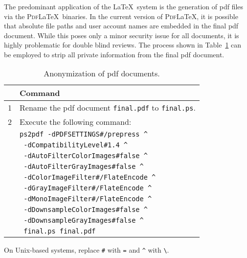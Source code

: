 The predominant application of the \LaTeX\ system is the generation of \gls{pdf} files via the \textsc{Pdf}\LaTeX\ binaries.
In the current version of \textsc{Pdf}\LaTeX, it is possible that absolute file paths and user account names are embedded in the final \gls{pdf} document.
While this poses only a minor security issue for all documents, it is highly problematic for double blind reviews.
The process shown in Table~\ref{tab:ps2pdf} can be employed to strip all private information from the final \gls{pdf} document.

\begin{table}[h]
    \centering
    \begin{tabular}{rl}
        \toprule
        & Command                                                            \\
        \midrule
        1 & Rename the \gls{pdf} document \verb|final.pdf| to \verb|final.ps|. \\
        2 & Execute the following command:                                     \\
        & \verb|ps2pdf -dPDFSETTINGS#/prepress ^|                            \\
        & \verb| -dCompatibilityLevel#1.4 ^|                                 \\
        & \verb| -dAutoFilterColorImages#false ^|                            \\
        & \verb| -dAutoFilterGrayImages#false ^|                             \\
        & \verb| -dColorImageFilter#/FlateEncode ^|                          \\
        & \verb| -dGrayImageFilter#/FlateEncode ^|                           \\
        & \verb| -dMonoImageFilter#/FlateEncode ^|                           \\
        & \verb| -dDownsampleColorImages#false ^|                            \\
        & \verb| -dDownsampleGrayImages#false ^|                             \\
        & \verb| final.ps final.pdf|                                         \\
        \bottomrule
    \end{tabular}

    On Unix-based systems, replace \verb|#| with \verb|=| and \verb|^| with \verb|\|.
    \caption{Anonymization of \gls{pdf} documents.}
    \label{tab:ps2pdf}
\end{table}


